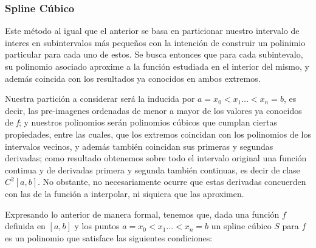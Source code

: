 \subsubsection{Spline Cúbico}

Este método al igual que el anterior se basa en particionar nuestro intervalo de interes en subintervalos más pequeños con la intención de construir un polinimio particular para cada uno de estos. Se busca entonces que para cada subintevalo, su polinomio asociado aproxime a la función estudiada en el interior del mismo, y además coincida con los resultados ya conocidos en ambos extremos. 

Nuestra partición a considerar será la inducida por $a = x_0 < x_1 \dots < x_n = b$, es decir, las pre-imagenes ordenadas de menor a mayor de los valores ya conocidos de \textit{f}; y nuestros polinomios serán polinomios cúbicos que cumplan ciertas propiedades, entre las cuales, que los extremos coincidan con los polinomios de los intervalos vecinos, y además también coincidan sus primeras y segundas derivadas; como resultado obtenemos sobre todo el intervalo original una función continua y de derivadas primera y segunda también continuas, es decir de clase $C^{2}[a, b]$. No obstante, no necesariamente ocurre que estas derivadas concuerden con las de la función a interpolar, ni siquiera que las aproximen.


Expresando lo anterior de manera formal, tenemos que, dada una función $f$ definida en $[a, b]$ y los puntos $a = x_0 < x_1 \dots < x_n = b$ un spline cúbico $S$ para $f$ es un polinomio que satisface las siguientes condiciones:


